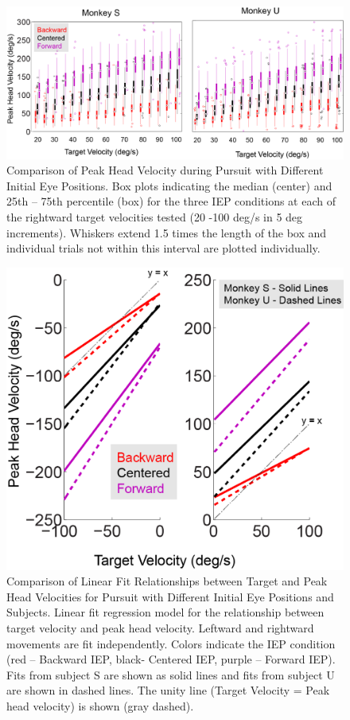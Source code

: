 \documentclass[12pt]{article}
\begin{document}
\begin{figure}[h]
\centering
\includegraphics[width=0.9\linewidth]{./figs/RampBoxplot}
\caption[Peak Head Velocity during Pursuit of Ramp Targets]{Comparison of Peak Head Velocity during Pursuit with Different Initial Eye Positions. Box plots indicating the median (center) and 25th – 75th percentile (box) for the three IEP conditions at each of the rightward target velocities tested (20 -100 deg/s in 5 deg increments). Whiskers extend 1.5 times the length of the box and individual trials not within this interval are plotted individually.}
\label{fig:RampBoxplot}
\end{figure}

\begin{figure}
\centering
\includegraphics[width=0.7\linewidth]{./figs/RampRegressions}
\caption{Comparison of Linear Fit Relationships between Target and Peak Head Velocities for Pursuit with Different Initial Eye Positions and Subjects. Linear fit regression model for the relationship between target velocity and peak head velocity. Leftward and rightward movements are fit independently. Colors indicate the IEP condition (red – Backward IEP, black- Centered IEP, purple – Forward IEP). Fits from subject S are shown as solid lines and fits from subject U are shown in dashed lines. The unity line (Target Velocity = Peak head velocity) is shown (gray dashed).}
\label{fig:RampRegressions}
\end{figure}
\end{document}
